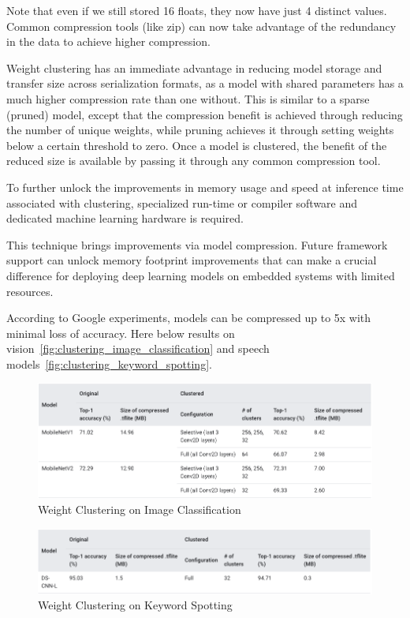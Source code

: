 Note that even if we still stored 16 floats, they now have just 4 distinct
values. Common compression tools (like zip) can now take advantage of the
redundancy in the data to achieve higher compression.

Weight clustering has an immediate advantage in reducing model storage and
transfer size across serialization formats, as a model with shared parameters
has a much higher compression rate than one without. This is similar to a
sparse (pruned) model, except that the compression benefit is achieved through
reducing the number of unique weights, while pruning achieves it through
setting weights below a certain threshold to zero. Once a model is clustered,
the benefit of the reduced size is available by passing it through any common
compression tool.

To further unlock the improvements in memory usage and speed at inference time
associated with clustering, specialized run-time or compiler software and
dedicated machine learning hardware is required.~\cite{tfmot:clustering_blog}

This technique brings improvements via model compression. Future framework
support can unlock memory footprint improvements that can make a crucial
difference for deploying deep learning models on embedded systems with limited
resources.

According to Google experiments, models can be compressed up to 5x with minimal
loss of accuracy. Here below results on
vision~\autoref{fig:clustering_image_classification} and speech
models~\autoref{fig:clustering_keyword_spotting}.

\begin{figure}[ht]
    \includegraphics[width=\textwidth]{images/introduction/clustering_image_classification.png}
    \centering
    \caption{Weight Clustering on Image Classification}\label{fig:clustering_image_classification}
\end{figure}


\begin{figure}[ht]
    \includegraphics[width=\textwidth]{images/introduction/clustering_keyword_spotting.png}
    \centering
    \caption{Weight Clustering on Keyword Spotting}\label{fig:clustering_keyword_spotting}
\end{figure}


